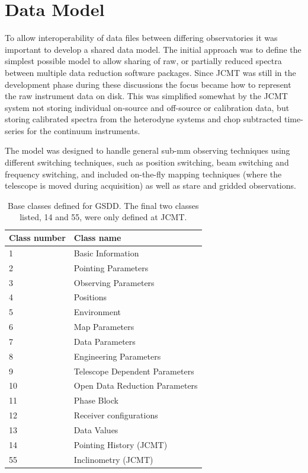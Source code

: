 \documentclass[final,authoryear,5p,times,twocolumn]{elsarticle}
\begin{document}
\section{Data Model}
\label{sec:datamodel}

To allow interoperability of data files between differing
observatories it was important to develop a shared data model. The
initial approach was to define the simplest possible model to allow
sharing of
raw, or partially reduced spectra between multiple data reduction software
packages. Since JCMT was still in the development phase during these
discussions the focus became how to represent the raw instrument data
on disk. This was simplified somewhat by the JCMT system not storing
individual on-source and off-source or calibration data, but storing
calibrated spectra from the heterodyne systems and chop subtracted
time-series for the continuum instruments.

The model was designed to handle general sub-mm observing techniques
using different switching techniques, such as position switching, beam
switching and frequency switching, and included on-the-fly mapping
techniques (where the telescope is moved during acquisition) as well
as stare and gridded observations.

\begin{table}
\caption{Base classes defined for GSDD. The final two classes listed,
  14 and 55, were only defined at JCMT.}
\label{tab:classes}
\begin{center}
\begin{tabular}{ll}
\hline
Class number &Class name \\ \hline
1         & Basic Information \\
2         & Pointing Parameters  \\
3         & Observing Parameters \\
4         & Positions \\
5         & Environment \\
6         & Map Parameters \\
7         & Data Parameters \\
8         & Engineering Parameters \\
9         & Telescope Dependent Parameters \\
10        & Open Data Reduction Parameters \\
11        & Phase Block \\
12        & Receiver configurations\\
13        & Data Values \\
14        & Pointing History (JCMT) \\
55        & Inclinometry (JCMT)\\
\hline
\end{tabular}
\end{center}
\end{table}
\end{document}
